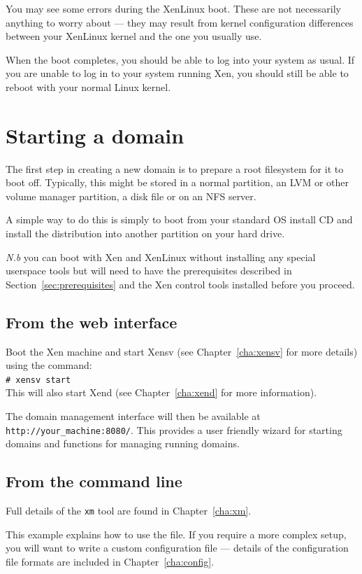 \documentclass[11pt,twoside,final,openright]{xenstyle}
\begin{document}
You may see some errors during the XenLinux boot.  These are not
necessarily anything to worry about --- they may result from kernel
configuration differences between your XenLinux kernel and the one you
usually use.

When the boot completes, you should be able to log into your system as
usual.  If you are unable to log in to your system running Xen, you
should still be able to reboot with your normal Linux kernel.


\chapter{Starting a domain}

The first step in creating a new domain is to prepare a root
filesystem for it to boot off.  Typically, this might be stored in a
normal partition, an LVM or other volume manager partition, a disk
file or on an NFS server.

A simple way to do this is simply to boot from your standard OS
install CD and install the distribution into another partition on your
hard drive.

{\em N.b } you can boot with Xen and XenLinux without installing any
special userspace tools but will need to have the prerequisites
described in Section~\ref{sec:prerequisites} and the Xen control tools
installed before you proceed.

\section{From the web interface}

Boot the Xen machine and start Xensv (see Chapter~\ref{cha:xensv} for
more details) using the command: \\
\verb_# xensv start_ \\
This will also start Xend (see Chapter~\ref{cha:xend} for more information).

The domain management interface will then be available at {\tt
http://your\_machine:8080/}.  This provides a user friendly wizard for
starting domains and functions for managing running domains.

\section{From the command line}

Full details of the {\tt xm} tool are found in Chapter~\ref{cha:xm}.

This example explains how to use the  file.  If you
require a more complex setup, you will want to write a custom
configuration file --- details of the configuration file formats are
included in Chapter~\ref{cha:config}.
\end{document}
